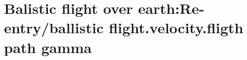 \section{ Balistic flight over earth:Re-entry/ballistic flight.velocity.fligth path gamma }\label{sec:q1}    
